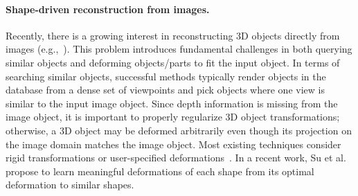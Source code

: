 \paragraph*{Shape-driven reconstruction from images.} Recently, there is a growing interest in reconstructing 3D objects directly from images (e.g.,~\cite{Xu:2011:PMO,Kholgade:2014:OMS,Aubry14,Su:2014:EID}). This problem introduces fundamental challenges in both querying similar objects and deforming objects/parts to fit the input object. In terms of searching similar objects, successful methods typically render objects in the database from a dense set of viewpoints and pick objects where one view is similar to the input image object. Since depth information is missing from the image object, it is important to properly regularize 3D object transformations; otherwise, a 3D object may be deformed arbitrarily even though its projection on the image domain matches the image object. Most existing techniques consider rigid transformations or user-specified deformations~\cite{Xu:2011:PMO}. In a recent work, Su et al.~\cite{Su:2014:EID} propose to learn meaningful deformations of each shape from its optimal deformation to similar shapes.



